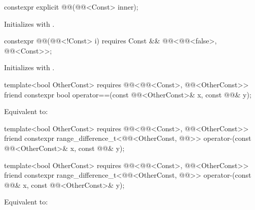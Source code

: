 \begin{itemdecl}
constexpr explicit @@(@@<Const> inner);
\end{itemdecl}

\begin{itemdescr}
\pnum
\effects
Initializes  with .
\end{itemdescr}

\begin{itemdecl}
constexpr @@(@@<!Const> i)
  requires Const && @@<@@<false>, @@<Const>>;
\end{itemdecl}

\begin{itemdescr}
\pnum
\effects
Initializes  with .
\end{itemdescr}

\begin{itemdecl}
template<bool OtherConst>
  requires @@<@@<Const>, @@<OtherConst>>
friend constexpr bool operator==(const @@<OtherConst>& x, const @@& y);
\end{itemdecl}

\begin{itemdescr}
\pnum
\effects
Equivalent to: 
\end{itemdescr}

\begin{itemdecl}
template<bool OtherConst>
  requires @@<@@<Const>, @@<OtherConst>>
friend constexpr range_difference_t<@@<OtherConst, @@>>
  operator-(const @@<OtherConst>& x, const @@& y);

template<bool OtherConst>
  requires @@<@@<Const>, @@<OtherConst>>
friend constexpr range_difference_t<@@<OtherConst, @@>>
  operator-(const @@& x, const @@<OtherConst>& y);
\end{itemdecl}

\begin{itemdescr}
\pnum
\effects
Equivalent to: 
\end{itemdescr}

